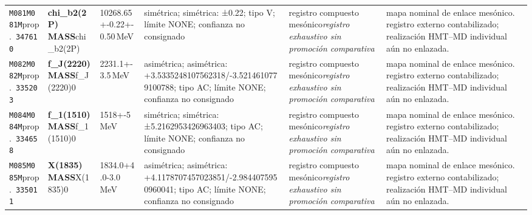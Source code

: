 \begin{landscape}
\begin{longtable}{L{1.85cm}L{4.45cm}L{2.35cm}L{4.05cm}L{3.35cm}L{7.15cm}}
\texttt{M081}\newline \texttt{M081M}\newline prop.\ \texttt{347610} & \textbf{chi\_\allowbreak{}b2(2P) MASS}\newline chi\_\allowbreak{}b2(2P) & 10268.65+-0.22+-0.50\,MeV & simétrica; simétrica: ±0.22; tipo V; límite NONE; confianza no consignado & registro compuesto mesónico\newline \emph{registro exhaustivo sin promoción comparativa} & mapa nominal de enlace mesónico. registro externo contabilizado; realización HMT--MD individual aún no enlazada. \\
\texttt{M082}\newline \texttt{M082M}\newline prop.\ \texttt{335203} & \textbf{f\_\allowbreak{}J(2220) MASS}\newline f\_\allowbreak{}J(2220)0 & 2231.1+-3.5\,MeV & asimétrica; asimétrica: +3.5335248107562318/-3.5214610779100788; tipo AC; límite NONE; confianza no consignado & registro compuesto mesónico\newline \emph{registro exhaustivo sin promoción comparativa} & mapa nominal de enlace mesónico. registro externo contabilizado; realización HMT--MD individual aún no enlazada. \\
\texttt{M084}\newline \texttt{M084M}\newline prop.\ \texttt{334658} & \textbf{f\_\allowbreak{}1(1510) MASS}\newline f\_\allowbreak{}1(1510)0 & 1518+-5\,MeV & simétrica; simétrica: ±5.2162953426963403; tipo AC; límite NONE; confianza no consignado & registro compuesto mesónico\newline \emph{registro exhaustivo sin promoción comparativa} & mapa nominal de enlace mesónico. registro externo contabilizado; realización HMT--MD individual aún no enlazada. \\
\texttt{M085}\newline \texttt{M085M}\newline prop.\ \texttt{335011} & \textbf{X(1835) MASS}\newline X(1835)0 & 1834.0+4.0-3.0\,MeV & asimétrica; asimétrica: +4.1178707457023851/-2.9844075950960041; tipo AC; límite NONE; confianza no consignado & registro compuesto mesónico\newline \emph{registro exhaustivo sin promoción comparativa} & mapa nominal de enlace mesónico. registro externo contabilizado; realización HMT--MD individual aún no enlazada. \\

\end{longtable}
\end{landscape}
